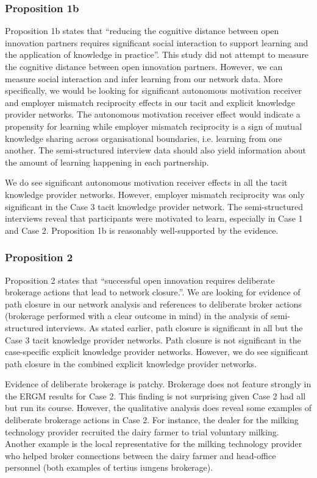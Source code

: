 \subsubsection{Proposition 1b}

Proposition 1b states that \enquote{reducing the cognitive distance between open innovation partners requires significant social interaction to support learning and the application of knowledge in practice}. This study did not attempt to measure the cognitive distance between open innovation partners. However, we can measure social interaction and infer learning from our network data. More specifically, we would be looking for significant autonomous motivation receiver and employer mismatch reciprocity effects in our tacit and explicit knowledge provider networks. The autonomous motivation receiver effect would indicate a propensity for learning while employer mismatch reciprocity is a sign of mutual knowledge sharing across organisational boundaries, i.e. learning from one another. The semi-structured interview data should also yield information about the amount of learning happening in each partnership. \medskip

We do see significant autonomous motivation receiver effects in all the tacit knowledge provider networks. However, employer mismatch reciprocity was only significant in the Case 3 tacit knowledge provider network. The semi-structured interviews reveal that participants were motivated to learn, especially in Case 1 and Case 2. Proposition 1b is reasonably well-supported by the evidence. 

\subsubsection{Proposition 2}

Proposition 2 states that \enquote{successful open innovation requires deliberate brokerage actions that lead to network closure.}. We are looking for evidence of path closure in our network analysis and references to deliberate broker actions (brokerage performed with a clear outcome in mind) in the analysis of semi-structured interviews. As stated earlier, path closure is significant in all but the Case 3 tacit knowledge provider networks. Path closure is not significant in the case-specific explicit knowledge provider networks. However, we do see significant path closure in the combined explicit knowledge provider networks. \medskip

Evidence of deliberate brokerage is patchy. Brokerage does not feature strongly in the ERGM results for Case 2. This finding is not surprising given Case 2 had all but run its course. However, the qualitative analysis does reveal some examples of deliberate brokerage actions in Case 2. For instance, the dealer for the milking technology provider recruited the dairy farmer to trial voluntary milking. Another example is the local representative for the milking technology provider who helped broker connections between the dairy farmer and head-office personnel (both examples of tertius iungens brokerage). \medskip

